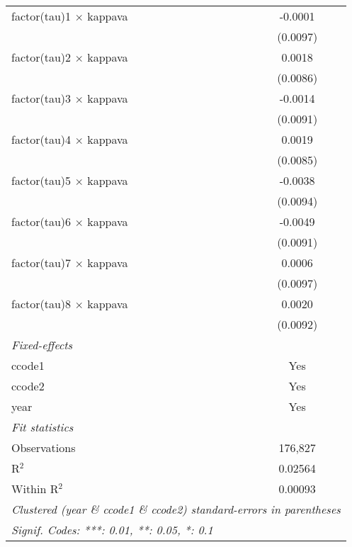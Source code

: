 \begin{tabular}{lc}
   factor(tau)1 $\times$ kappava   & -0.0001\\   
                                   & (0.0097)\\   
   factor(tau)2 $\times$ kappava   & 0.0018\\   
                                   & (0.0086)\\   
   factor(tau)3 $\times$ kappava   & -0.0014\\   
                                   & (0.0091)\\   
   factor(tau)4 $\times$ kappava   & 0.0019\\   
                                   & (0.0085)\\   
   factor(tau)5 $\times$ kappava   & -0.0038\\   
                                   & (0.0094)\\   
   factor(tau)6 $\times$ kappava   & -0.0049\\   
                                   & (0.0091)\\   
   factor(tau)7 $\times$ kappava   & 0.0006\\   
                                   & (0.0097)\\   
   factor(tau)8 $\times$ kappava   & 0.0020\\   
                                   & (0.0092)\\   
   \midrule
   \emph{Fixed-effects}\\
   ccode1                          & Yes\\  
   ccode2                          & Yes\\  
   year                            & Yes\\  
   \midrule
   \emph{Fit statistics}\\
   Observations                    & 176,827\\  
   R$^2$                           & 0.02564\\  
   Within R$^2$                    & 0.00093\\  
   \midrule \midrule
   \multicolumn{2}{l}{\emph{Clustered (year \& ccode1 \& ccode2) standard-errors in parentheses}}\\
   \multicolumn{2}{l}{\emph{Signif. Codes: ***: 0.01, **: 0.05, *: 0.1}}\\
\end{tabular}
\par\endgroup



